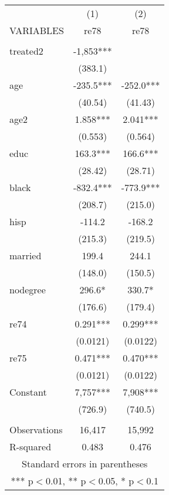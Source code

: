 \begin{tabular}{lcc} \hline
 & (1) & (2) \\
VARIABLES & re78 & re78 \\ \hline
 &  &  \\
treated2 & -1,853*** &  \\
 & (383.1) &  \\
age & -235.5*** & -252.0*** \\
 & (40.54) & (41.43) \\
age2 & 1.858*** & 2.041*** \\
 & (0.553) & (0.564) \\
educ & 163.3*** & 166.6*** \\
 & (28.42) & (28.71) \\
black & -832.4*** & -773.9*** \\
 & (208.7) & (215.0) \\
hisp & -114.2 & -168.2 \\
 & (215.3) & (219.5) \\
married & 199.4 & 244.1 \\
 & (148.0) & (150.5) \\
nodegree & 296.6* & 330.7* \\
 & (176.6) & (179.4) \\
re74 & 0.291*** & 0.299*** \\
 & (0.0121) & (0.0122) \\
re75 & 0.471*** & 0.470*** \\
 & (0.0121) & (0.0122) \\
Constant & 7,757*** & 7,908*** \\
 & (726.9) & (740.5) \\
 &  &  \\
Observations & 16,417 & 15,992 \\
 R-squared & 0.483 & 0.476 \\ \hline
\multicolumn{3}{c}{ Standard errors in parentheses} \\
\multicolumn{3}{c}{ *** p$<$0.01, ** p$<$0.05, * p$<$0.1} \\
\end{tabular}
